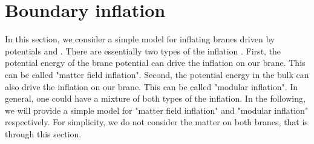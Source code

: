 \documentclass[a4paper,11pt]{article}
\begin{document}
\section{Boundary inflation}
In this section, we consider a simple model for inflating branes 
driven by potentials \coordHE{} and \coordHE{}. There are 
essentially two types of the inflation \cite{Lukas1}. 
First, the potential energy 
of the brane potential \coordHE{} can drive the inflation on our brane. 
This can be called "matter field inflation".
Second, the potential energy in the bulk can also drive 
the inflation on our brane. This can be called "modular inflation".
In general, one could have a mixture of both types of the inflation. 
In the following, we will provide a simple model for "matter field
inflation" and "modular inflation" respectively. 
For simplicity, we do not consider the matter on both branes, that 
is \coordHE{} through this section. 
\end{document}
